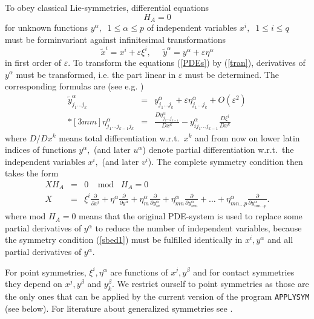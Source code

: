 To obey classical Lie-symmetries, differential equations
\begin{equation}
H_A = 0              \label{PDEs}
\end{equation}
for unknown functions $y^\alpha,\;\;1\leq \alpha \leq p$
of independent variables $x^i,\;\;1\leq i \leq q$
must be forminvariant against infinitesimal transformations
\begin{equation}
\tilde{x}^i = x^i + \varepsilon \xi^i, \;\; \;\;\;
        \tilde{y}^\alpha = y^\alpha + \varepsilon \eta^\alpha  \label{tran}
\end{equation}
in first order of $\varepsilon.$ To transform the equations (\ref{PDEs})
by (\ref{tran}), derivatives of $y^\alpha$ must be transformed, i.e. the part
linear in $\varepsilon$ must be determined. The corresponding formulas are
(see e.g. \cite{Olver:89,Stephani:89})
\begin{eqnarray}
\tilde{y}^\alpha_{j_1\ldots j_k} & = &
y^\alpha_{j_1\ldots j_k} + \varepsilon
\eta^\alpha_{j_1\ldots j_k} + O(\varepsilon^2)  \nonumber \\*[3mm]
\eta^\alpha_{j_1\ldots j_{k-1}j_k} & = &
  \frac{D \eta^\alpha_{j_1\ldots j_{k-1}}}{D x^k} -
  y^\alpha_{ij_1\ldots j_{k-1}}\frac{D \xi^i}{D x^k} \label{recur}
\end{eqnarray}
where $D/Dx^k$ means total differentiation w.r.t.\ $x^k$ and
from now on lower latin indices of functions $y^\alpha,$ 
(and later $u^\alpha$)
denote partial differentiation w.r.t.\ the independent variables $x^i,$
(and later $v^i$).
The complete symmetry condition then takes the form
\begin{eqnarray}
X H_A & = & 0 \;\; \; \; \mbox{mod} \; \; \; H_A = 0\  \label{sbed1} \\
X & = & \xi^i \frac{\partial}{\partial x^i} +
 \eta^\alpha \frac{\partial}{\partial y^\alpha} +
 \eta^\alpha_m \frac{\partial}{\partial y^\alpha_m} +
 \eta^\alpha_{mn} \frac{\partial}{\partial y^\alpha_{mn}} + \ldots +
 \eta^\alpha_{mn\ldots p} \frac{\partial}{\partial y^\alpha_{mn\ldots p}}.
\label{sbed2}
\end{eqnarray}
where mod $H_A = 0$ means that the original PDE-system is used to replace
some partial derivatives of $y^\alpha$ to reduce the number of independent
variables, because the symmetry condition (\ref{sbed1}) must be
fulfilled identically in $x^i, y^\alpha$ and all partial
derivatives of $y^\alpha.$

For point symmetries, $\xi^i, \eta^\alpha$ are functions of $x^j,
y^\beta$ and for contact symmetries they depend on $x^j, y^\beta$ and
$y^\beta_k.$ We restrict ourself to point symmetries as those are the only
ones that can be applied by the current version of the program \texttt{APPLYSYM}
(see below). For literature about generalized symmetries see \cite{Hereman:95}.

